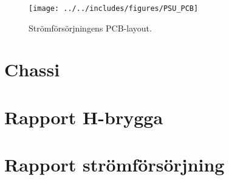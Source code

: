 \begin{figure}[htbp!]
\centering
\texttt{[image: ../../includes/figures/PSU\_PCB]}
\caption{Strömförsörjningens PCB-layout.}
\label{fig:appendix_PSU_pcb_layout}
\end{figure}

\section{Chassi}


\newpage
\section{Rapport H-brygga}
\label{apx:H-bridge}


\section{Rapport strömförsörjning}
\label{apx:PSU}

